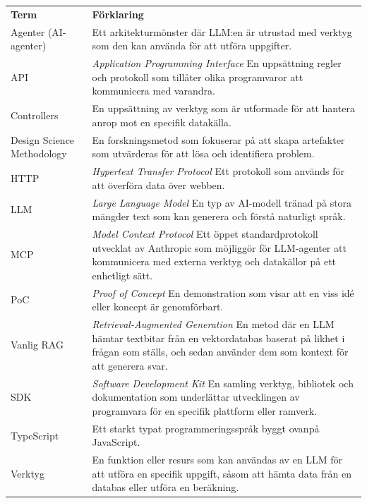 \section*{}\label{sec:terminology}
{}

\renewcommand{\arraystretch}{1.5}
\begin{tabular}{l p{10cm}}
  \textbf{Term} & \textbf{Förklaring} \\[4pt]
  Agenter (AI-agenter) & Ett arkitekturmönster där LLM:en är utrustad med verktyg som den kan använda för att utföra uppgifter. \\
  API & \emph{Application Programming Interface} En uppsättning regler och protokoll som tillåter olika programvaror att kommunicera med varandra.\\
  Controllers & En uppsättning av verktyg som är utformade för att hantera anrop mot en specifik datakälla. \\
  Design Science Methodology & En forskningsmetod som fokuserar på att skapa artefakter som utvärderas för att lösa och identifiera problem.\\
  HTTP & \emph{Hypertext Transfer Protocol} Ett protokoll som används för att överföra data över webben.\\
  LLM & \emph{Large Language Model} En typ av AI-modell tränad på stora mängder text som kan generera och förstå naturligt språk.\\
  MCP & \emph{Model Context Protocol} Ett öppet standardprotokoll utvecklat av Anthropic som möjliggör för LLM-agenter att kommunicera med externa verktyg och datakällor på ett enhetligt sätt.\\
  PoC & \emph{Proof of Concept} En demonstration som visar att en viss idé eller koncept är genomförbart.\\
  Vanlig RAG & \emph{Retrieval-Augmented Generation} En metod där en LLM hämtar textbitar från en vektordatabas baserat på likhet i frågan som ställs, och sedan använder dem som kontext för att generera svar.\\
  SDK & \emph{Software Development Kit} En samling verktyg, bibliotek och dokumentation som underlättar utvecklingen av programvara för en specifik plattform eller ramverk.\\
  TypeScript & Ett starkt typat programmeringsspråk byggt ovanpå JavaScript.\\
  Verktyg & En funktion eller resurs som kan användas av en LLM för att utföra en specifik uppgift, såsom att hämta data från en databas eller utföra en beräkning.\\
\end{tabular}

